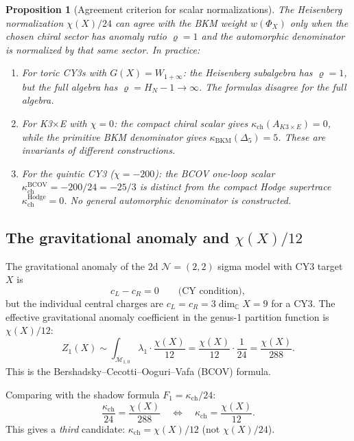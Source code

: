\documentclass[11pt]{article}
\newtheorem{proposition}[theorem]{Proposition}
\theoremstyle{definition}
\theoremstyle{remark}
\newcommand{\Mbar}{\overline{\mathcal{M}}}
\begin{document}
\begin{proposition}[Agreement criterion for scalar normalizations]
\label{prop:agreement}
The Heisenberg normalization $\chi(X)/24$ can agree with the BKM weight
$w(\Phi_X)$ only when the chosen chiral sector has anomaly ratio
$\varrho=1$ and the automorphic denominator is normalized by that same
sector. In practice:
\begin{enumerate}[label=\textup{(\roman*)}]
\item For toric CY3s with $G(X) = W_{1+\infty}$: the Heisenberg
 subalgebra has $\varrho = 1$, but the full algebra has
 $\varrho = H_N - 1 \to \infty$. The formulas disagree for the
 full algebra.

\item For K3$\times$E with $\chi = 0$: the compact chiral scalar gives
 $\kappa_{\mathrm{ch}}(A_{K3\times E})=0$, while the primitive BKM
 denominator gives $\kappa_{\mathrm{BKM}}(\Delta_5)=5$. These are
 invariants of different constructions.

\item For the quintic CY3 ($\chi = -200$): the BCOV one-loop scalar
 $\kappa_{\mathrm{ch}}^{\mathrm{BCOV}}=-200/24=-25/3$ is distinct from
 the compact Hodge supertrace $\kappa_{\mathrm{ch}}^{\mathrm{Hodge}}=0$.
 No general automorphic denominator is constructed.
\end{enumerate}
\end{proposition}

\subsection{The gravitational anomaly and $\chi(X)/12$}

The gravitational anomaly of the 2d $\mathcal{N}=(2,2)$ sigma model with
CY3 target $X$ is
\begin{equation}\label{eq:grav-anomaly}
 c_L - c_R = 0
 \qquad\text{(CY condition)},
\end{equation}
but the individual central charges are $c_L = c_R = 3\dim_{\mathbb{C}} X = 9$
for a CY3. The effective gravitational anomaly coefficient in the
genus-1 partition function is $\chi(X)/12$:
\begin{equation}\label{eq:genus1-grav}
 Z_1(X) \sim \int_{\Mbar_{1,0}} \lambda_1 \cdot \frac{\chi(X)}{12}
 = \frac{\chi(X)}{12} \cdot \frac{1}{24}
 = \frac{\chi(X)}{288}.
\end{equation}
This is the Bershadsky--Cecotti--Ooguri--Vafa (BCOV) formula.

Comparing with the shadow formula $F_1 = \kappa_{\mathrm{ch}}/24$:
\begin{equation}\label{eq:comparison}
 \frac{\kappa_{\mathrm{ch}}}{24} = \frac{\chi(X)}{288}
 \quad\Longleftrightarrow\quad
 \kappa_{\mathrm{ch}} = \frac{\chi(X)}{12}.
\end{equation}
This gives a \emph{third} candidate: $\kappa_{\mathrm{ch}} = \chi(X)/12$ (not
$\chi(X)/24$).
\end{document}
